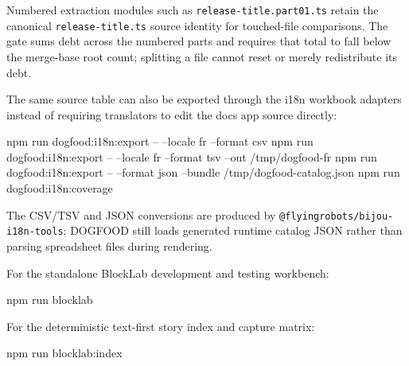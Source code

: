 Numbered extraction modules such as \texttt{r\allowbreak{}e\allowbreak{}l\allowbreak{}e\allowbreak{}a\allowbreak{}s\allowbreak{}e\allowbreak{}-\allowbreak{}t\allowbreak{}i\allowbreak{}t\allowbreak{}l\allowbreak{}e\allowbreak{}.\allowbreak{}p\allowbreak{}a\allowbreak{}r\allowbreak{}t\allowbreak{}0\allowbreak{}1\allowbreak{}.\allowbreak{}t\allowbreak{}s} retain the canonical \texttt{r\allowbreak{}e\allowbreak{}l\allowbreak{}e\allowbreak{}a\allowbreak{}s\allowbreak{}e\allowbreak{}-\allowbreak{}t\allowbreak{}i\allowbreak{}t\allowbreak{}l\allowbreak{}e\allowbreak{}.\allowbreak{}t\allowbreak{}s} source identity for touched-file comparisons. The gate sums debt across the numbered parts and requires that total to fall below the merge-base root count; splitting a file cannot reset or merely redistribute its debt.

The same source table can also be exported through the i18n workbook adapters instead of requiring translators to edit the docs app source directly:

\begin{CodeBlock}
npm run dogfood:i18n:export -- --locale fr --format csv
npm run dogfood:i18n:export -- --locale fr --format tsv --out /tmp/dogfood-fr
npm run dogfood:i18n:export -- --format json --bundle /tmp/dogfood-catalog.json
npm run dogfood:i18n:coverage
\end{CodeBlock}

The CSV/TSV and JSON conversions are produced by \texttt{@\allowbreak{}f\allowbreak{}l\allowbreak{}y\allowbreak{}i\allowbreak{}n\allowbreak{}g\allowbreak{}r\allowbreak{}o\allowbreak{}b\allowbreak{}o\allowbreak{}t\allowbreak{}s\allowbreak{}/\allowbreak{}b\allowbreak{}i\allowbreak{}j\allowbreak{}o\allowbreak{}u\allowbreak{}-\allowbreak{}i\allowbreak{}1\allowbreak{}8\allowbreak{}n\allowbreak{}-\allowbreak{}t\allowbreak{}o\allowbreak{}o\allowbreak{}l\allowbreak{}s}; DOGFOOD still loads generated runtime catalog JSON rather than parsing spreadsheet files during rendering.

For the standalone BlockLab development and testing workbench:

\begin{CodeBlock}
npm run blocklab
\end{CodeBlock}

For the deterministic text-first story index and capture matrix:

\begin{CodeBlock}
npm run blocklab:index
\end{CodeBlock}

